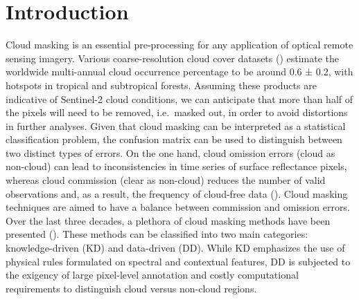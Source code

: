 \documentclass[a4paper, nobind]{templates/cdethesis}
\begin{document}
\minitoc 

\hypertarget{introduction}{%
\section{Introduction}\label{introduction}}

Cloud masking is an essential pre-processing for any application of optical remote sensing imagery. Various coarse-resolution cloud cover datasets (\cite{sassen2008classifying, winker2010calipso, Wilson2016}) estimate the worldwide multi-annual cloud occurrence percentage to be around 0.6 ± 0.2, with hotspots in tropical and subtropical forests. Assuming these products are indicative of Sentinel-2 cloud conditions, we can anticipate that more than half of the pixels will need to be removed, i.e.~masked out, in order to avoid distortions in further analyses. Given that cloud masking can be interpreted as a statistical classification problem, the confusion matrix can be used to distinguish between two distinct types of errors. On the one hand, cloud omission errors (cloud as non-cloud) can lead to inconsistencies in time series of surface reflectance pixels, whereas cloud commission (clear as non-cloud) reduces the number of valid observations and, as a result, the frequency of cloud-free data (\cite{skakun2022cloud}). Cloud masking techniques are aimed to have a balance between commission and omission errors. Over the last three decades, a plethora of cloud masking methods have been presented (\cite{Hagolle2017, Domnich2021, Louis2016, Qiu2019, richter2019atmospheric, jan_wevers_2021_5788067, Lopez-Puigdollers2021, frantz2019force}). These methods can be classified into two main categories: knowledge-driven (KD) and data-driven (DD). While KD emphasizes the use of physical rules formulated on spectral and contextual features, DD is subjected to the exigency of large pixel-level annotation and costly computational requirements to distinguish cloud versus non-cloud regions.
\end{document}
